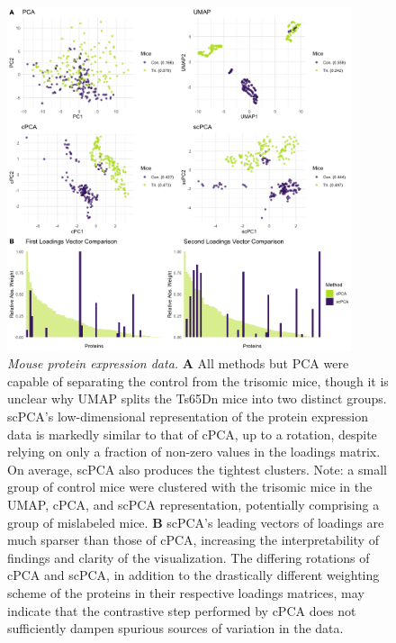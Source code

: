 \begin{figure}[!htbp]
  \centering
  \includegraphics[width=0.9\textwidth]{figures/mice_results.png}
  \caption{{\em Mouse protein expression data.} \textbf{A} All methods but PCA were capable of separating the control from the trisomic mice, though it is unclear why UMAP splits the Ts65Dn mice into two distinct groups. scPCA's low-dimensional representation of the protein expression data is markedly similar to that of cPCA, up to a rotation, despite relying on only a fraction of non-zero values in the loadings matrix. On average, scPCA also produces the tightest clusters. Note: a small group of control mice were clustered with the trisomic mice in the UMAP, cPCA, and scPCA representation, potentially comprising a group of mislabeled mice. \textbf{B} scPCA's leading vectors of loadings are much sparser than those of cPCA, increasing the interpretability of findings and clarity of the visualization. The differing rotations of cPCA and scPCA, in addition to the drastically different weighting scheme of the proteins in their respective loadings matrices, may indicate that the contrastive step performed by cPCA does not sufficiently dampen spurious sources of variation in the data.}
  \label{fig:comp_mice}
\end{figure}


